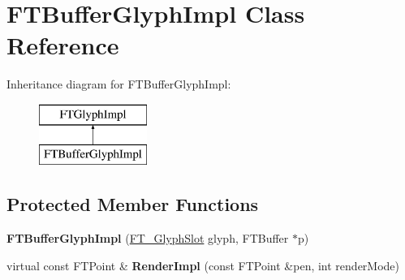 \hypertarget{class_f_t_buffer_glyph_impl}{}\section{F\+T\+Buffer\+Glyph\+Impl Class Reference}
\label{class_f_t_buffer_glyph_impl}
Inheritance diagram for F\+T\+Buffer\+Glyph\+Impl\+:\begin{figure}[H]
\begin{center}
\leavevmode
\includegraphics[height=2.000000cm]{class_f_t_buffer_glyph_impl}
\end{center}
\end{figure}
\subsection*{Protected Member Functions}
\begin{DoxyCompactItemize}
\item 
{\bfseries F\+T\+Buffer\+Glyph\+Impl} (\hyperlink{struct_f_t___glyph_slot_rec__}{F\+T\+\_\+\+Glyph\+Slot} glyph, F\+T\+Buffer $\ast$p)\hypertarget{class_f_t_buffer_glyph_impl_a02a187494995d95792ef66767f04c56d}{}\label{class_f_t_buffer_glyph_impl_a02a187494995d95792ef66767f04c56d}

\item 
virtual const F\+T\+Point \& {\bfseries Render\+Impl} (const F\+T\+Point \&pen, int render\+Mode)\hypertarget{class_f_t_buffer_glyph_impl_a4f7f56caf34309cf7e1408a631b419de}{}\label{class_f_t_buffer_glyph_impl_a4f7f56caf34309cf7e1408a631b419de}

\end{DoxyCompactItemize}
